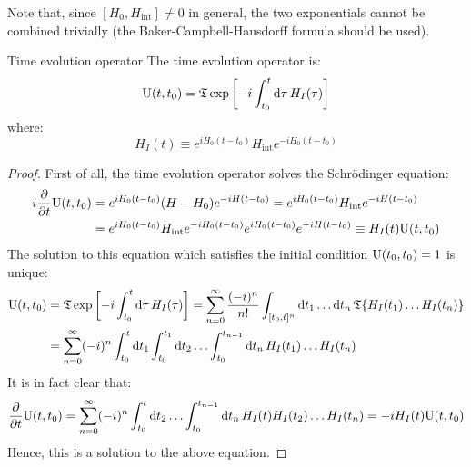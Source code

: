 Note that, since $ [H_0,H_\text{int}] \neq 0 $ in general, the two exponentials cannot be combined trivially (the Baker-Campbell-Hausdorff formula should be used).

\begin{proposition}{Time evolution operator}
  The time evolution operator is:
  \begin{equation}
    \mathrm{U}(t,t_0) = \mathfrak{T} \exp \left[ -i \int_{t_0}^t \mathrm{d}\tau\, H_I(\tau) \right]
  \end{equation}
  where:
  \begin{equation}
    H_I(t) \equiv e^{i H_0 (t-t_0)} H_\text{int} e^{-i H_0 (t-t_0)}
  \end{equation}
\end{proposition}

\begin{proofbox}
  \begin{proof}
    First of all, the time evolution operator solves the Schrödinger equation:
    \begin{equation*}
      \begin{split}
        i \frac{\partial}{\partial t} \mathrm{U}(t,t_0)
        & = e^{i H_0 (t-t_0)} (H - H_0) e^{-i H (t-t_0)} = e^{i H_0 (t-t_0)} H_\text{int} e^{-i H (t-t_0)} \\
        & = e^{i H_0 (t-t_0)} H_\text{int} e^{-i H_0 (t-t_0)} e^{i H_0 (t-t_0)} e^{-i H (t-t_0)} \equiv H_I(t) \mathrm{U}(t,t_0)
      \end{split}
    \end{equation*}
    The solution to this equation which satisfies the initial condition $ \mathrm{U}(t_0,t_0) = 1 $ is unique:
    \begin{equation*}
      \begin{split}
        \mathrm{U}(t,t_0)
        & = \mathfrak{T} \exp \left[ -i \int_{t_0}^t \mathrm{d}\tau\, H_I(\tau) \right] = \sum_{n = 0}^{\infty} \frac{(-i)^n}{n!} \int_{[t_0,t]^n} \mathrm{d} t_1 \dots \mathrm{d} t_n\, \mathfrak{T}\{H_I(t_1) \dots H_I(t_n)\} \\
        & = \sum_{n = 0}^{\infty} (-i)^n \int_{t_0}^t \mathrm{d} t_1 \int_{t_0}^{t_1} \mathrm{d} t_2 \dots \int_{t_0}^{t_{n-1}} \mathrm{d} t_n\, H_I(t_1) \dots H_I(t_n)
      \end{split}
    \end{equation*}
    It is in fact clear that:
    \begin{equation*}
      \frac{\partial}{\partial t} \mathrm{U}(t,t_0) = \sum_{n = 0}^{\infty} (-i)^n \int_{t_0}^{t} \mathrm{d} t_2 \dots \int_{t_0}^{t_{n-1}} \mathrm{d} t_n\, H_I(t) H_I(t_2) \dots H_I(t_n) = -i H_I(t) \mathrm{U}(t,t_0)
    \end{equation*}
    Hence, this is a solution to the above equation.
  \end{proof}
\end{proofbox}

